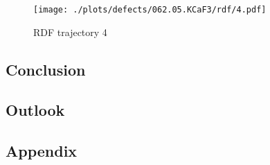 \documentclass[nobib,a4paper,twoside,notoc,justified,marginals=justified]{tufte-book}
\begin{document}
\begin{figure}
	\texttt{[image: ./plots/defects/062.05.KCaF3/rdf/4.pdf]}
	\caption{RDF trajectory 4}
	\label{}
\end{figure}

\chapter{Conclusion}

\chapter{Outlook}






\begin{appendices}
  \part*{Appendix}
  
\end{appendices}

\backmatter



\end{document}

